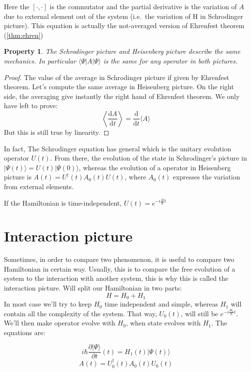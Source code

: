 \documentclass[10pt,a4paper]{report}
\theoremstyle{plain}
\newtheorem{prop}[thm]{Property}
\theoremstyle{definition}
\theoremstyle{remark}
\newcommand{\ket}[1]{|#1\rangle}
\newcommand{\bra}[1]{\langle#1|}
\newcommand{\dd}{\mathrm{d}}
\newcommand{\der}[2]{\frac{\dd{#1}}{\dd{#2}}}
\begin{document}
Here the $[\cdot,\cdot]$ is the commutator and the partial derivative is the
variation of $A$ due to external element out of the system (i.e.~the variation
of H in Schrodinger picture). This equation is actually the not-averaged version
of Ehrenfest theorem (\ref{thm:ehren})

\begin{prop}
  The Schrodinger picture and Heisenberg picture describe the same mechanics. In
  particular $\bra \Psi A \ket \Psi$ is the same for any operator in both pictures.
\end{prop}

\begin{proof}
  The value of the average in Schrodinger picture if given by Ehrenfest theorem.
  Let's compute the same average in Heisenberg picture. On the right side, the
  averaging give instantly the right hand of Ehrenfest theorem. We only have
  left to prove:
  \[ \left \langle \der A t\right\rangle = \der{}t\langle A\rangle\]
  But this is still true by linearity.
\end{proof}

In fact, The Schrodinger equation has general which is the unitary evolution
operator $U(t)$. From there, the evolution of the state in Schrodinger's picture
in $\ket {\Psi(t)} = U(t) \ket {\Psi(0)}$, whereas the evolution of a operator
in Heisenberg picture is $A(t) = U^\dagger(t)A_0(t)U(t)$, where $A_0(t)$
expresses the variation from external elements.

If the Hamiltonian is time-independent, $U(t) = e^{-i\frac H\hbar t}$

\section{Interaction picture}

Sometimes, in order to compare two phenomenon, it is useful to compare two
Hamiltonian in certain way. Usually, this is to compare the free evolution of a
system to the interaction with another system, this is why this is called the
interaction picture. Will split our Hamiltonian in two parts:
\[H = H_0 + H_1\]
In most case we'll try to keep $H_0$ time independent and simple, whereas $H_1$
will contain all the complexity of the system. That way, $U_0(t)$, will still be
$e^{-i\frac {H_0}\hbar t}$. We'll then make operator evolve with $H_0$, when
state evolves with $H_1$. The equations are:

\[i\hbar \frac{\partial \ket \Psi}{\partial t} (t) = H_1(t) \ket {\Psi(t)} \]
\[A(t) = U_0^\dagger(t)A_0(t)U_0(t)\]
\end{document}
